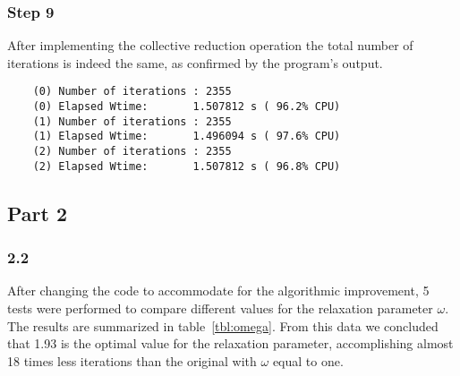 \subsubsection{Step 9}

After implementing the collective reduction operation the total number of iterations is indeed the same, as confirmed by the program's output.

\begin{lstlisting}
	(0) Number of iterations : 2355
	(0) Elapsed Wtime:       1.507812 s ( 96.2% CPU)
	(1) Number of iterations : 2355
	(1) Elapsed Wtime:       1.496094 s ( 97.6% CPU)
	(2) Number of iterations : 2355
	(2) Elapsed Wtime:       1.507812 s ( 96.8% CPU)
\end{lstlisting}



\subsection{Part 2}

\subsubsection{2.2}

After changing the code to accommodate for the algorithmic improvement, 5 tests were performed to compare different values for the relaxation parameter $\omega$. The results are summarized in table~\ref{tbl:omega}.
From this data we concluded that 1.93 is the optimal value for the relaxation parameter, accomplishing almost 18 times less iterations than the original with $\omega$ equal to one.

